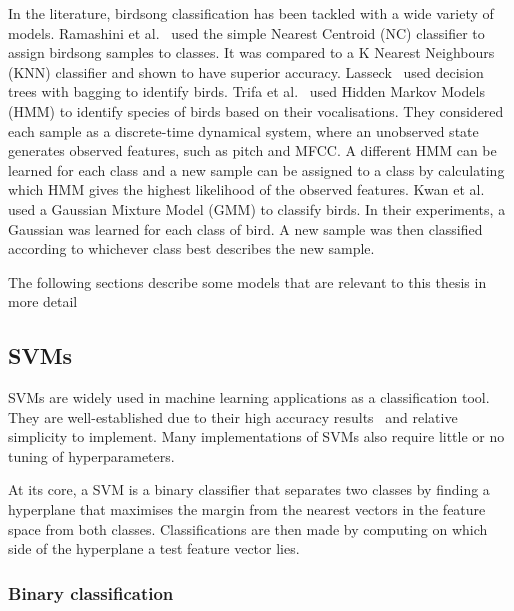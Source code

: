In the literature, birdsong classification has been tackled with a wide variety
of models. Ramashini et al.~\cite{ramashini2019bird} used the simple Nearest
Centroid (NC) classifier to assign birdsong samples to classes. It was compared
to a K Nearest Neighbours (KNN) classifier and shown to have superior accuracy.
Lasseck~\cite{lasseck2015improved} used decision trees with bagging to identify
birds. Trifa et al.~\cite{trifa2008automated} used Hidden Markov Models (HMM) to
identify species of birds based on their vocalisations. They considered each
sample as a discrete-time dynamical system, where an unobserved state generates
observed features, such as pitch and MFCC\@. A different HMM can be learned for
each class and a new sample can be assigned to a class by calculating which HMM
gives the highest likelihood of the observed features. Kwan et
al.~\cite{kwan2006automated} used a Gaussian Mixture Model (GMM) to classify
birds. In their experiments, a Gaussian was learned for each class of bird. A
new sample was then classified according to whichever class best describes the
new sample.

The following sections describe some models that are relevant to this thesis in
more detail

\subsection{SVMs}

SVMs are widely used in machine learning applications as a classification tool.
They are well-established due to their high accuracy
results~\cite{fagerlund2007bird} and relative simplicity to implement. Many
implementations of SVMs also require little or no tuning of hyperparameters.

At its core, a SVM is a binary classifier that separates two classes by finding
a hyperplane that maximises the margin from the nearest vectors in the feature
space from both classes. Classifications are then made by computing on which
side of the hyperplane a test feature vector lies.

\subsubsection{Binary classification}

